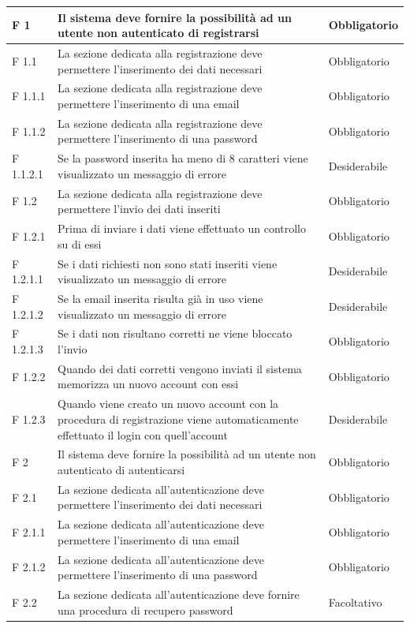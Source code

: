 \documentclass[a4paper,11pt]{article}
\begin{document}
\begin{longtable}{p{}p{}p{}}
F 1 & Il sistema deve fornire la possibilità ad un utente non autenticato di registrarsi & Obbligatorio\\
\midrule
F 1.1 & La sezione dedicata alla registrazione deve permettere l'inserimento dei dati necessari & Obbligatorio\\
\midrule
F 1.1.1 & La sezione dedicata alla registrazione deve permettere l'inserimento di una email & Obbligatorio\\
\midrule
F 1.1.2 & La sezione dedicata alla registrazione deve permettere l'inserimento di una password & Obbligatorio\\
\midrule
F 1.1.2.1 & Se la password inserita ha meno di 8 caratteri viene visualizzato un messaggio di errore & Desiderabile\\
\midrule
F 1.2 & La sezione dedicata alla registrazione deve permettere l'invio dei dati inseriti & Obbligatorio\\
\midrule
F 1.2.1 & Prima di inviare i dati viene effettuato un controllo su di essi & Obbligatorio\\
\midrule
F 1.2.1.1 & Se i dati richiesti non sono stati inseriti viene visualizzato un messaggio di errore & Desiderabile\\
\midrule
F 1.2.1.2 & Se la email inserita risulta già in uso viene visualizzato un messaggio di errore & Desiderabile\\
\midrule
F 1.2.1.3 & Se i dati non risultano corretti ne viene bloccato l'invio & Obbligatorio\\
\midrule
F 1.2.2 & Quando dei dati corretti vengono inviati il sistema memorizza un nuovo account con essi & Obbligatorio\\
\midrule
F 1.2.3 & Quando viene creato un nuovo account con la procedura di registrazione viene automaticamente effettuato il login con quell'account & Desiderabile\\
\midrule
F 2 & Il sistema deve fornire la possibilità ad un utente non autenticato di autenticarsi & Obbligatorio\\
\midrule
F 2.1 & La sezione dedicata all'autenticazione deve permettere l'inserimento dei dati necessari & Obbligatorio\\
\midrule
F 2.1.1 & La sezione dedicata all'autenticazione deve permettere l'inserimento di una email & Obbligatorio\\
\midrule
F 2.1.2 & La sezione dedicata all'autenticazione deve permettere l'inserimento di una password & Obbligatorio\\
\midrule
F 2.2 & La sezione dedicata all'autenticazione deve fornire una procedura di recupero password & Facoltativo\\

\end{longtable}
\end{document}
